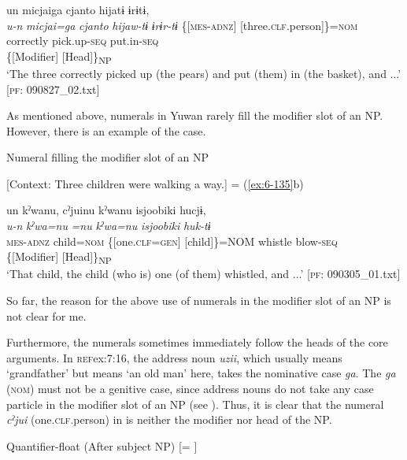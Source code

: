 \ex \label{ex:7:14b}
{\TM}
\glll un  micjaiga  {\textbar}cjanto{\textbar}  hijatɨ  ɨrɨtɨ,\\
      \textit{u-n}  \textit{micjai=ga}  \textit{cjanto}  \textit{hijaw-tɨ}      \textit{ɨrɨr-tɨ}
      \{[\textsc{mes}-\textsc{adnz}]  [three.\textsc{clf}.person]\}=\textsc{nom}  correctly  pick.up-\textsc{seq}            put.in-\textsc{seq}\\
      \{[Modifier]  [Head]\}\textsubscript{NP}    \\
\glt    ‘The three correctly picked up (the pears) and put (them) in (the basket), and ...’     [\textsc{pf}: 090827\_02.txt]

    \z
\z

As mentioned above, numerals in Yuwan rarely fill the modifier slot of an NP. However, there is an example of the case.

\ea \label{ex:7:15}  Numeral filling the modifier slot of an NP

  [Context: Three children were walking a way.] = (\ref{ex:6-135}b)

{\TM}
\gllll  un  kˀwanu,  cˀjuinu  kˀwanu  isjoobiki   hucjɨ,\\
\textit{u-n}  \textit{kˀwa=nu}  \textit{=nu}  \textit{kˀwa=nu}  \textit{isjoobiki} \textit{huk-tɨ}\\
\textsc{mes}-\textsc{adnz}  child=\textsc{nom}  \{[one.\textsc{clf}=\textsc{gen}]  [child]\}=NOM  whistle   blow-\textsc{seq}\\
\{[Modifier]  [Head]\}\textsubscript{NP}      \\
\glt ‘That child, the child (who is) one (of them) whistled, and ...’ [\textsc{pf}: 090305\_01.txt]

\z

So far, the reason for the above use of numerals in the modifier slot of an NP is not clear for me.

Furthermore, the numerals sometimes immediately follow the heads of the core arguments. In \textsc{ref}{ex:7:16}, the address noun \textit{uzii}, which usually means ‘grandfather’ but means ‘an old man’ here, takes the nominative case \textit{ga}. The \textit{ga} (\textsc{nom}) must not be a genitive case, since address nouns do not take any case particle in the modifier slot of an NP (see ). Thus, it is clear that the numeral \textit{cˀjui} (one.\textsc{clf}.person) in  is neither the modifier nor head of the NP.

\ea \label{ex:7:16}  Quantifier-float (After subject NP) [= ]

